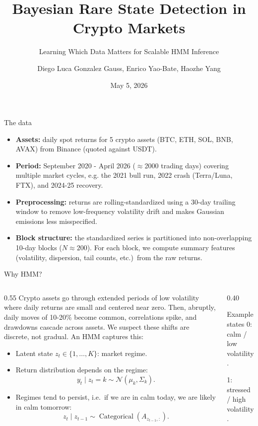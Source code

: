 \documentclass[aspectratio=169]{beamer}
\title{Bayesian Rare State Detection in Crypto Markets}
\subtitle{Learning Which Data Matters for Scalable HMM Inference}
\author{Diego Luca Gonzalez Gauss, Enrico Yao-Bate, Haozhe Yang}
\institute{STAT 221 Spring 2026 Final Project}
\date{May 5, 2026}
\begin{document}
\begin{frame}
  \titlepage
\end{frame}

\begin{frame}{The data}
  \begin{itemize}
    \item \textbf{Assets:} daily spot returns for 5 crypto assets (BTC, ETH, SOL, BNB, AVAX) from Binance (quoted against USDT).
    \item \textbf{Period:} September 2020 - April 2026 ($\approx$2000 trading days) covering multiple market cycles, e.g. the 2021 bull run, 2022 crash (Terra/Luna, FTX), and 2024-25 recovery.
    \item \textbf{Preprocessing:} returns are rolling-standardized using a 30-day trailing window to remove low-frequency volatility drift and makes Gaussian emissions less misspecified.
    \item \textbf{Block structure:} the standardized series is partitioned into non-overlapping 10-day blocks ($N \approx 200$). For each block, we compute summary features (volatility, dispersion, tail counts, etc.)\ from the raw returns.
  \end{itemize}
\end{frame}

\begin{frame}{Why HMM?}
  \begin{columns}[T]
    \begin{column}{0.55\linewidth}
      Crypto assets go through extended periods of low volatility where daily returns are small and centered near zero. Then, abruptly, daily moves of 10-20\% become common, correlations spike, and drawdowns cascade across assets. We suspect these shifts are discrete, not gradual. An HMM captures this:
      \begin{itemize}
        \item Latent state $z_t \in \{1, \dots, K\}$: market regime.
        \item Return distribution depends on the regime:
        \[
          y_t \mid z_t=k \sim \mathcal{N}(\mu_k, \Sigma_k).
        \]
        \item Regimes tend to persist, i.e.\ if we are in calm today, we are likely in calm tomorrow:
        \[
          z_t \mid z_{t-1} \sim \operatorname{Categorical}(A_{z_{t-1},:}).
        \]
      \end{itemize}
    \end{column}
    \begin{column}{0.40\linewidth}
      \begin{block}{Example states}
        0: calm / low volatility.

        1: stressed / high volatility.
      \end{block}
    \end{column}
  \end{columns}
\end{frame}
\end{document}
